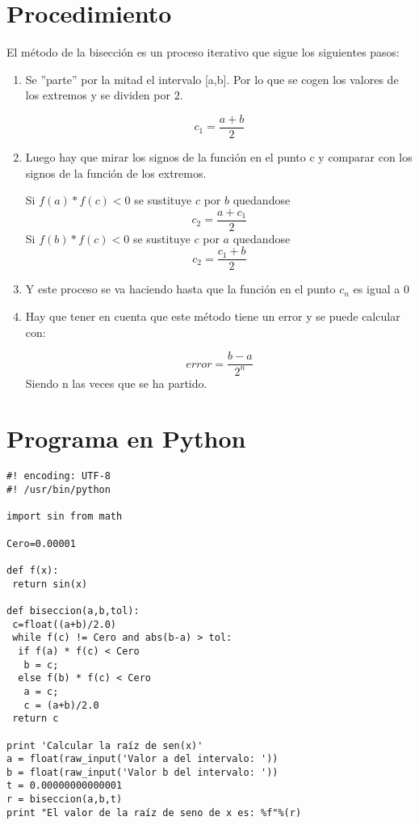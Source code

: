 


\section{Procedimiento}
\label{3:sec:1}
El método de la bisección es un proceso iterativo que sigue los siguientes pasos:
\begin{enumerate}
 \item
  Se ''parte'' por la mitad el intervalo [a,b]. Por lo que se cogen los valores de los extremos y se dividen por $2$.
  \begin{center}
   $$ c_1=\frac{a+b}{2} $$
  \end{center}
 \item
  Luego hay que mirar los signos de la función en el punto c y comparar con los signos de la función de los extremos.
   \begin{enumerate}
    \Item
     Si $f(a)*f(c)<0$ se sustituye $c$ por $b$ quedandose $$c_2=\frac{a+c_1}{2}$$
    \Item
     Si $f(b)*f(c)<0$ se sustituye $c$ por $a$ quedandose $$c_2=\frac{c_1+b}{2}$$
   \end{enumerate}
 \item
  Y este proceso se va haciendo hasta que la función en el punto $c_n$ es igual a $0$
 \item
  Hay que tener en cuenta que este método tiene un error y se puede calcular con:
  \begin{center}
    $$error=\frac{b-a}{2^n}$$ 
  Siendo n las veces que se ha partido.
  \end{center}
\end{enumerate}

\section{Programa en Python}
\label{3:sec:2}
\begin{verbatim}
#! encoding: UTF-8
#! /usr/bin/python 

import sin from math

Cero=0.00001

def f(x):
 return sin(x)

def biseccion(a,b,tol):
 c=float((a+b)/2.0)
 while f(c) != Cero and abs(b-a) > tol:
  if f(a) * f(c) < Cero
   b = c;
  else f(b) * f(c) < Cero
   a = c;
   c = (a+b)/2.0
 return c

print 'Calcular la raíz de sen(x)'
a = float(raw_input('Valor a del intervalo: '))
b = float(raw_input('Valor b del intervalo: '))
t = 0.00000000000001
r = biseccion(a,b,t)
print "El valor de la raíz de seno de x es: %f"%(r)
\end{verbatim}